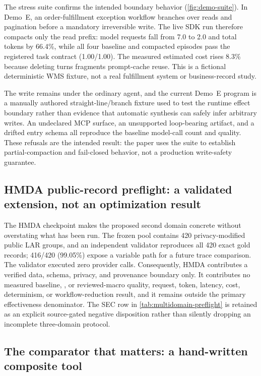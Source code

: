 The stress suite confirms the intended boundary behavior (\cref{fig:demo-suite}).  In Demo~E, an order-fulfillment
exception workflow branches over reads and pagination before a mandatory irreversible
write.  The live SDK run therefore compacts only the read prefix: model requests fall
from 7.0 to 2.0 and total tokens by 66.4\%, while all four baseline and compacted episodes
pass the registered task contract (1.00/1.00).  The measured estimated cost rises 8.3\%
because deleting turns fragments prompt-cache reuse.  This is a fictional deterministic
WMS fixture, not a real fulfillment system or business-record study.

The write remains under the ordinary agent, and the current Demo~E program is a manually
authored straight-line/branch fixture used to test the runtime effect boundary rather than
evidence that automatic synthesis can safely infer arbitrary writes.  An undeclared MCP
surface, an unsupported loop-bearing artifact, and a drifted entry schema all reproduce
the baseline model-call count and quality.  These refusals are the intended result: the
paper uses the suite to establish partial-compaction and fail-closed behavior, not a
production write-safety guarantee.

\subsection{HMDA public-record preflight: a validated extension, not an optimization result}
\label{sec:hmda-results}

The HMDA checkpoint makes the proposed second domain concrete without overstating what
has been run.  The frozen pool contains 420 privacy-modified public LAR groups, and an
independent validator reproduces all 420 exact gold records; 416/420 (99.05\%) expose a
variable path for a future trace comparison.  The validator executed zero provider calls.
Consequently, HMDA contributes a verified data, schema, privacy, and provenance boundary
only.  It contributes no measured baseline, \grc, or reviewed-macro quality, request,
token, latency, cost, determinism, or workflow-reduction result, and it remains outside
the primary effectiveness denominator.  The SEC row in \cref{tab:multidomain-preflight}
is retained as an explicit source-gated negative disposition rather than silently dropping
an incomplete three-domain protocol.

\subsection{The comparator that matters: a hand-written composite tool}
\label{sec:comparator}

